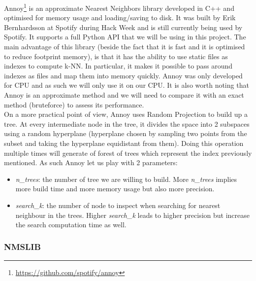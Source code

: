 \documentclass[a4paper]{article}
\begin{document}
	Annoy\footnote{\url{https://github.com/spotify/annoy}} is an approximate Nearest Neighbors library developed in C++ and optimised for memory usage and loading/saving to disk. It was built by Erik Bernhardsson at Spotify during Hack Week and is still currently being used by Spotify. It supports a full Python API that we will be using in this project. The main advantage of this library (beside the fact that it is fast and it is optimised to reduce footprint memory), is that it has the ability to use static files as indexes to compute k-NN. In particular, it makes it possible to pass around indexes as files and map them into memory quickly. Annoy was only developed for CPU and as such we will only use it on our CPU. It is also worth noting that Annoy is an approximate method and we will need to compare it with an exact method (bruteforce) to assess its performance. \\
	
	On a more practical point of view, Annoy uses Random Projection to build up a tree. At every intermediate node in the tree, it divides the space into 2 subspaces using a random hyperplane (hyperplane chosen by sampling two points from the subset and taking the hyperplane equidistant from them). Doing this operation multiple times will generate of forest of trees which represent the index previously mentioned. As such Annoy let us play with 2 parameters:
	
	\begin{itemize}
		\item \textit{n\_trees}: the number of tree we are willing to build. More \textit{n\_trees} implies more build time and more memory usage but also more precision.
		\item \textit{search\_k}: the number of node to inspect when searching for nearest neighbour in the trees. Higher \textit{search\_k} leads to higher precision but increase the search computation time as well.
	\end{itemize}

\subsubsection{NMSLIB}
\end{document}

